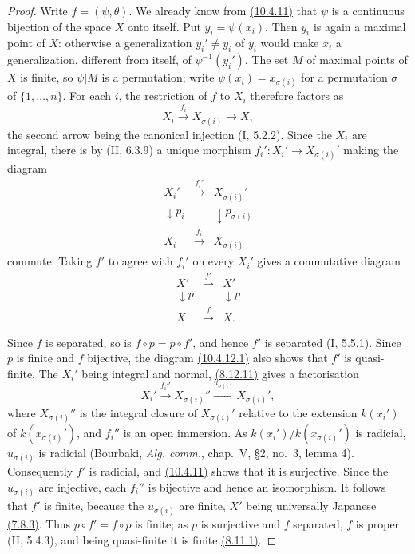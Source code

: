 \begin{proof}
Write $f=(\psi,\theta)$.  We already know from {\hyperlink{ega4.c04.statement.10-4-11}{(10.4.11)}} that $\psi$ is
a continuous bijection of the space $X$ onto itself.  Put
$y_i=\psi(x_i)$.  Then $y_i$ is again a maximal point of $X$: otherwise
a generalization $y_i'\neq y_i$ of $y_i$ would make $x_i$ a
generalization, different from itself, of $\psi^{-1}(y_i')$.  The set
$M$ of maximal points of $X$ is finite, so $\psi|M$ is a permutation;
write $\psi(x_i)=x_{\sigma(i)}$ for a permutation $\sigma$ of
$\{1,\ldots,n\}$.  For each $i$, the restriction of $f$ to $X_i$
therefore factors as
\[
 X_i\xrightarrow{f_i}X_{\sigma(i)}\longrightarrow X,
\]
the second arrow being the canonical injection (I, 5.2.2).  Since the
$X_i$ are integral, there is by (II, 6.3.9) a unique morphism
$f_i':X_i'\to X_{\sigma(i)}'$ making the diagram
\[
\begin{array}{ccc}
X_i'&\xrightarrow{f_i'}&X_{\sigma(i)}'\\
\downarrow p_i&&\downarrow p_{\sigma(i)}\\
X_i&\xrightarrow{f_i}&X_{\sigma(i)}
\end{array}
\]
commute.  Taking $f'$ to agree with $f_i'$ on every $X_i'$ gives a
commutative diagram
\label{IV.10.4.12.1}
\begin{equation}
\label{IV.10.4.12.1.errata}
\begin{array}{ccc}
X'&\xrightarrow{f'}&X'\\
\downarrow p&&\downarrow p\\
X&\xrightarrow{f}&X.
\end{array}
\tag{10.4.12.1}
\end{equation}

Since $f$ is separated, so is $f\circ p=p\circ f'$, and hence $f'$ is
separated (I, 5.5.1).  Since $p$ is finite and $f$ bijective, the
diagram {\hyperlink{ega4.c04.sec.10-4-12-1}{(10.4.12.1)}} also shows that $f'$ is quasi-finite.  The
$X_i'$ being integral and normal, {\hyperlink{ega4.c04.cor.8-12-11}{(8.12.11)}} gives a factorisation
\[
 X_i'\xrightarrow{f_i''}X_{\sigma(i)}''
 \xrightarrow{u_{\sigma(i)}}X_{\sigma(i)}',
\]
where $X_{\sigma(i)}''$ is the integral closure of
$X_{\sigma(i)}'$ relative to the extension $k(x_i')$ of
$k(x_{\sigma(i)}')$, and $f_i''$ is an open immersion.  As
$k(x_i')/k(x_{\sigma(i)}')$ is radicial, $u_{\sigma(i)}$ is radicial
(Bourbaki, \emph{Alg. comm.}, chap.~V, \S2, no.~3, lemma 4).
Consequently $f'$ is radicial, and {\hyperlink{ega4.c04.statement.10-4-11}{(10.4.11)}} shows that it is
surjective.  Since the $u_{\sigma(i)}$ are injective, each $f_i''$ is
bijective and hence an isomorphism.  It follows that $f'$ is finite,
because the $u_{\sigma(i)}$ are finite, $X'$ being universally
Japanese {\hyperlink{ega4.c04.statement.7-8-3}{(7.8.3)}}.  Thus $p\circ f'=f\circ p$ is finite; as $p$ is
surjective and $f$ separated, $f$ is proper (II, 5.4.3), and being
quasi-finite it is finite {\hyperlink{ega4.c04.thm.8-11-1}{(8.11.1)}}.


\end{proof}
